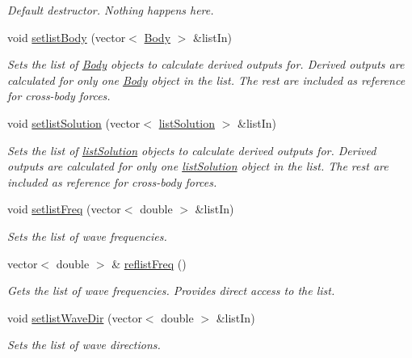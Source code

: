 \begin{DoxyCompactItemize}
\begin{DoxyCompactList}\small\item\em Default destructor. Nothing happens here. \end{DoxyCompactList}\item 
void \hyperlink{class_outputs_body_a7be4a4a8ebdd43a7f0c8b56a9cf0d800}{setlist\-Body} (vector$<$ \hyperlink{class_body}{Body} $>$ \&list\-In)
\begin{DoxyCompactList}\small\item\em Sets the list of \hyperlink{class_body}{Body} objects to calculate derived outputs for. Derived outputs are calculated for only one \hyperlink{class_body}{Body} object in the list. The rest are included as reference for cross-\/body forces. \end{DoxyCompactList}\item 
void \hyperlink{class_outputs_body_a555b87de16dbb48444dcef24de08c70d}{setlist\-Solution} (vector$<$ \hyperlink{classlist_solution}{list\-Solution} $>$ \&list\-In)
\begin{DoxyCompactList}\small\item\em Sets the list of \hyperlink{classlist_solution}{list\-Solution} objects to calculate derived outputs for. Derived outputs are calculated for only one \hyperlink{classlist_solution}{list\-Solution} object in the list. The rest are included as reference for cross-\/body forces. \end{DoxyCompactList}\item 
void \hyperlink{class_outputs_body_a876c62a76404b2a963d78d3753456fc3}{setlist\-Freq} (vector$<$ double $>$ \&list\-In)
\begin{DoxyCompactList}\small\item\em Sets the list of wave frequencies. \end{DoxyCompactList}\item 
vector$<$ double $>$ \& \hyperlink{class_outputs_body_a880542382668134727cb312757c11d07}{reflist\-Freq} ()
\begin{DoxyCompactList}\small\item\em Gets the list of wave frequencies. Provides direct access to the list. \end{DoxyCompactList}\item 
void \hyperlink{class_outputs_body_a3cfa70c13f0330d7ce94b5755243aac4}{setlist\-Wave\-Dir} (vector$<$ double $>$ \&list\-In)
\begin{DoxyCompactList}\small\item\em Sets the list of wave directions. \end{DoxyCompactList}\item 

\end{DoxyCompactItemize}

